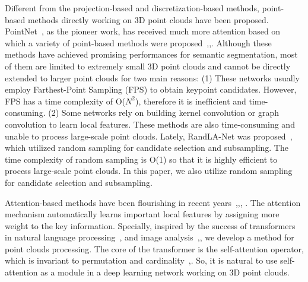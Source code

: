 \documentclass[review]{elsarticle}
\begin{document}
Different from the projection-based and discretization-based methods, point-based methods directly working on 3D point clouds have been proposed. PointNet~\cite{qi2017pointnet}, as the pioneer work, has received much more attention based on which a variety of point-based methods were proposed~\cite{li2018pointcnn},\cite{jiang2018pointsift},\cite{thomas2019kpconv}. Although these methods have achieved promising performances for semantic segmentation, most of them are limited to extremely small 3D point clouds and cannot be directly extended to larger point clouds for two main reasons: (1) These networks usually employ Farthest-Point Sampling (FPS) to obtain keypoint candidates. However, FPS has a time complexity of O($N^{2}$), therefore it is inefficient and time-consuming. (2) Some networks rely on building kernel convolution or graph convolution to learn local features. These methods are also time-consuming and unable to process large-scale point clouds. Lately, RandLA-Net was proposed~\cite{hu2020randla}, which utilized random sampling for candidate selection and subsampling. The time complexity of random sampling is O(1) so that it is highly efficient to process large-scale point clouds. In this paper, we also utilize random sampling for candidate selection and subsampling.

Attention-based methods have been flourishing in recent years~\cite{wang2019exploiting},\cite{zhao2019pooling},\cite{Wang_2019_CVPR},
\cite{feng2020point}. The attention mechanism automatically learns important local features by assigning more weight to the key information. Specially, inspired by the success of transformers in natural language processing~\cite{vaswani2017attention},\cite{wu2019pay} and image analysis~\cite{hu2019local},\cite{ramachandran2019stand}, we develop a method for point clouds processing. The core of the transformer is the self-attention operator, which is invariant to permutation and cardinality~\cite{ramachandran2019stand},\cite{Zhao_2020_CVPR}. So, it is natural to use self-attention as a module in a deep learning network working on 3D point clouds.
\end{document}
